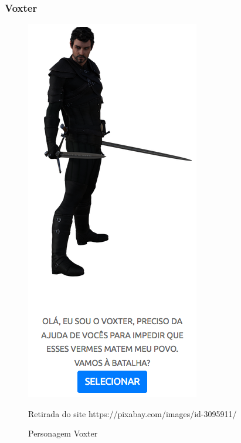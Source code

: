 \subsubsection{Voxter}
\begin{figure}[h]
	\centering
	\includegraphics[keepaspectratio=true,scale=0.6]{figuras/voxter.png}
	\caption{Personagem Voxter}
	Retirada do site https://pixabay.com/images/id-3095911/
	\label{voxter}
\end{figure}
\clearpage
